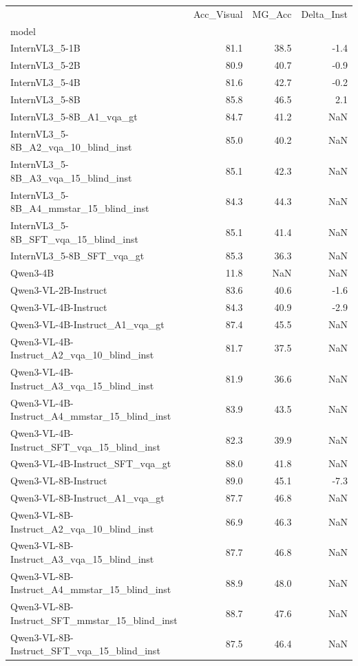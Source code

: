 \begin{tabular}{lrrr}
\toprule
 & Acc_Visual & MG_Acc & Delta_Inst \\
model &  &  &  \\
\midrule
InternVL3_5-1B & 81.1 & 38.5 & -1.4 \\
InternVL3_5-2B & 80.9 & 40.7 & -0.9 \\
InternVL3_5-4B & 81.6 & 42.7 & -0.2 \\
InternVL3_5-8B & 85.8 & 46.5 & 2.1 \\
InternVL3_5-8B_A1_vqa_gt & 84.7 & 41.2 & NaN \\
InternVL3_5-8B_A2_vqa_10_blind_inst & 85.0 & 40.2 & NaN \\
InternVL3_5-8B_A3_vqa_15_blind_inst & 85.1 & 42.3 & NaN \\
InternVL3_5-8B_A4_mmstar_15_blind_inst & 84.3 & 44.3 & NaN \\
InternVL3_5-8B_SFT_vqa_15_blind_inst & 85.1 & 41.4 & NaN \\
InternVL3_5-8B_SFT_vqa_gt & 85.3 & 36.3 & NaN \\
Qwen3-4B & 11.8 & NaN & NaN \\
Qwen3-VL-2B-Instruct & 83.6 & 40.6 & -1.6 \\
Qwen3-VL-4B-Instruct & 84.3 & 40.9 & -2.9 \\
Qwen3-VL-4B-Instruct_A1_vqa_gt & 87.4 & 45.5 & NaN \\
Qwen3-VL-4B-Instruct_A2_vqa_10_blind_inst & 81.7 & 37.5 & NaN \\
Qwen3-VL-4B-Instruct_A3_vqa_15_blind_inst & 81.9 & 36.6 & NaN \\
Qwen3-VL-4B-Instruct_A4_mmstar_15_blind_inst & 83.9 & 43.5 & NaN \\
Qwen3-VL-4B-Instruct_SFT_vqa_15_blind_inst & 82.3 & 39.9 & NaN \\
Qwen3-VL-4B-Instruct_SFT_vqa_gt & 88.0 & 41.8 & NaN \\
Qwen3-VL-8B-Instruct & 89.0 & 45.1 & -7.3 \\
Qwen3-VL-8B-Instruct_A1_vqa_gt & 87.7 & 46.8 & NaN \\
Qwen3-VL-8B-Instruct_A2_vqa_10_blind_inst & 86.9 & 46.3 & NaN \\
Qwen3-VL-8B-Instruct_A3_vqa_15_blind_inst & 87.7 & 46.8 & NaN \\
Qwen3-VL-8B-Instruct_A4_mmstar_15_blind_inst & 88.9 & 48.0 & NaN \\
Qwen3-VL-8B-Instruct_SFT_mmstar_15_blind_inst & 88.7 & 47.6 & NaN \\
Qwen3-VL-8B-Instruct_SFT_vqa_15_blind_inst & 87.5 & 46.4 & NaN \\

\end{tabular}
